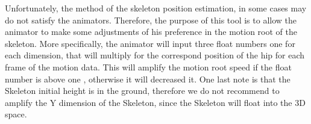 Unfortunately, the method of the skeleton position estimation, in some cases may do not satisfy the animators. Therefore, the purpose of this tool is to allow the animator to make some adjustments of his preference in the motion root of the skeleton. More specifically, the animator will input three float numbers one for each dimension, that will multiply for the correspond position of the hip for each frame of the motion data. This will amplify the motion root speed if the float number is above one , otherwise it will decreased it. One last note is that the Skeleton initial height is in the ground, therefore we do not recommend to amplify the Y dimension of the Skeleton, since the Skeleton will float into the 3D space. 